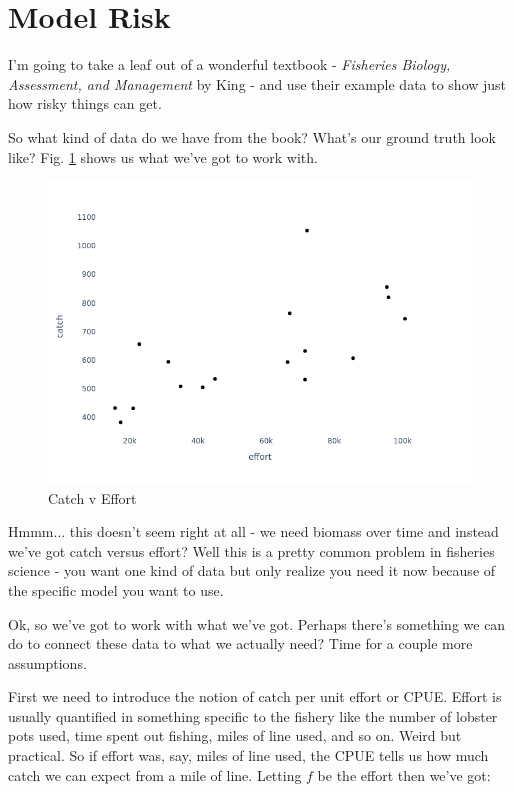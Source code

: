 \documentclass[11pt,a5paper]{book}
\begin{document}
\section{Model Risk}

I'm going to take a leaf out of a wonderful textbook - \textit{Fisheries Biology, Assessment, and Management} by King - and use their example data to show just how risky things can get. 
\newline

So what kind of data do we have from the book? What's our ground truth look like? Fig. \ref{fig:catch_v_effort} shows us what we've got to work with. 
\newline

\begin{figure}[h!] 
  \includegraphics[width=\linewidth]{notebooks/SurplusModels/measurements.png}
  \caption{Catch v Effort}
  \label{fig:catch_v_effort}
\end{figure}

Hmmm... this doesn't seem right at all - we need biomass over time and instead we've got catch versus effort? Well this is a pretty common problem in fisheries science - you want one kind of data but only realize you need it now because of the specific model you want to use. 
\newline

Ok, so we've got to work with what we've got. Perhaps there's something we can do to connect these data to what we actually need? Time for a couple more assumptions.
\newline

First we need to introduce the notion of catch per unit effort or CPUE. Effort is usually quantified in something specific to the fishery like the number of lobster pots used, time spent out fishing, miles of line used, and so on. Weird but practical. So if effort was, say, miles of line used, the CPUE tells us how much catch we can expect from a mile of line. Letting $f$ be the effort then we've got:
\end{document}
